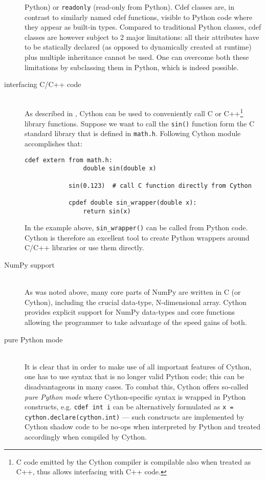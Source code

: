 \begin{description}
		Python) or \verb|readonly| (read-only from Python). Cdef classes are, in contrast to similarly
		named cdef functions, visible to Python code where they appear as built-in types. Compared
		to traditional Python classes, cdef classes are however subject to 2 major limitations: all
		their attributes have to be statically declared (as opposed to dynamically created at
		runtime) plus multiple inheritance cannot be used. One can overcome both these limitations
		by subclassing them in Python, which is indeed possible.
	\item[interfacing C/C++ code] \hfill \\
		As described in \cite{BehBraSel:09}, Cython can be used to conveniently call C or
		C++\footnote{C code emitted by the Cython compiler is compilable also when treated as C++,
		thus allows interfacing with C++ code.} library functions. Suppose we want to call the
		\verb|sin()| function form the C standard library that is defined in \verb|math.h|. Following
		Cython module accomplishes that:
		\vspace{\parskip}
		\begin{Verbatim}[samepage=true,gobble=3,label=sin\_wrapper.pyx,frame=single]
			cdef extern from math.h:
			    double sin(double x)

			sin(0.123)  # call C function directly from Cython

			cpdef double sin_wrapper(double x):
			    return sin(x)
		\end{Verbatim}
		In the example above, \verb|sin_wrapper()| can be called from Python code. Cython is
		therefore an excellent tool to create Python wrappers around C/C++ libraries or use them
		directly.
	\item[NumPy support] \hfill \\
		As was noted above, many core parts of NumPy are written in C (or Cython), including the
		crucial data-type, N-dimensional array. Cython provides explicit support for NumPy
		data-types and core functions allowing the programmer to take advantage of the speed gains
		of both.~\cite{Sel:09}
	\item[pure Python mode] \hfill \\
		It is clear that in order to make use of all important features of Cython, one has to use
		syntax that is no longer valid Python code; this can be disadvantageous in many cases. To
		combat this, Cython offers so-called \emph{pure Python mode} where Cython-specific syntax
		is wrapped in Python constructs, e.g. \verb|cdef int i| can be alternatively formulated
		as \verb|x = cython.declare(cython.int)| --- such constructs are implemented by Cython
		shadow code to be no-ops when interpreted by Python and treated accordingly when compiled
		by Cython.


\end{description}
